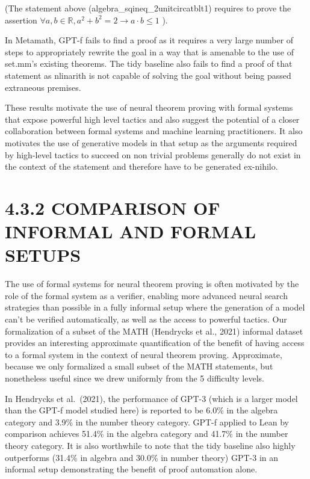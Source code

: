 \documentclass[
]{article}
\begin{document}
(The statement above (algebra\_sqineq\_2unitcircatblt1) requires to
prove the assertion
\(\forall a, b \in \mathbb{R}, a^2 + b^2 = 2 \to a \cdot b \leq 1\) ).

In Metamath, GPT-f fails to find a proof as it requires a very large
number of steps to appropriately rewrite the goal in a way that is
amenable to the use of set.mm's existing theorems. The tidy baseline
also fails to find a proof of that statement as nlinarith is not capable
of solving the goal without being passed extraneous premises.

These results motivate the use of neural theorem proving with formal
systems that expose powerful high level tactics and also suggest the
potential of a closer collaboration between formal systems and machine
learning practitioners. It also motivates the use of generative models
in that setup as the arguments required by high-level tactics to succeed
on non trivial problems generally do not exist in the context of the
statement and therefore have to be generated ex-nihilo.

\section{4.3.2 COMPARISON OF INFORMAL AND FORMAL
SETUPS}\label{comparison-of-informal-and-formal-setups}

The use of formal systems for neural theorem proving is often motivated
by the role of the formal system as a verifier, enabling more advanced
neural search strategies than possible in a fully informal setup where
the generation of a model can't be verified automatically, as well as
the access to powerful tactics. Our formalization of a subset of the
MATH (Hendrycks et al., 2021) informal dataset provides an interesting
approximate quantification of the benefit of having access to a formal
system in the context of neural theorem proving. Approximate, because we
only formalized a small subset of the MATH statements, but nonetheless
useful since we drew uniformly from the 5 difficulty levels.

In Hendrycks et al.~(2021), the performance of GPT-3 (which is a larger
model than the GPT-f model studied here) is reported to be 6.0\% in the
algebra category and 3.9\% in the number theory category. GPT-f applied
to Lean by comparison achieves 51.4\% in the algebra category and 41.7\%
in the number theory category. It is also worthwhile to note that the
tidy baseline also highly outperforms (31.4\% in algebra and 30.0\% in
number theory) GPT-3 in an informal setup demonstrating the benefit of
proof automation alone.
\end{document}
